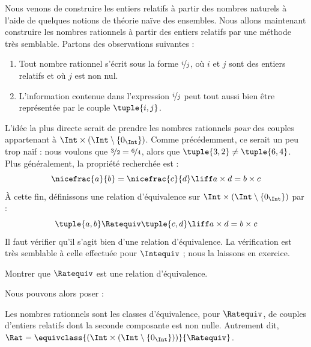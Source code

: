\documentclass[../../../include/open-logic-section]{subfiles}
\begin{document}

Nous venons de construire les entiers relatifs à partir des nombres naturels
à l'aide de quelques notions de théorie naïve des ensembles. Nous allons
maintenant construire les nombres rationnels à partir des entiers relatifs
par une méthode très semblable. Partons des observations suivantes :
\begin{enumerate}
	\item Tout nombre rationnel s'écrit sous la forme $\nicefrac{i}{j}$,
	où $i$ et $j$ sont des entiers relatifs et où $j$ est non nul.
	\item L'information contenue dans l'expression $\nicefrac{i}{j}$
	peut tout aussi bien être représentée par le couple $\tuple{ i, j}$.
\end{enumerate}
L'idée la plus directe serait de prendre les nombres rationnels \emph{pour}
des couples appartenant à $\Int \times (\Int \setminus \{0_\Int\})$.
Comme précédemment, ce serait un peu trop naïf : nous voulons que
$\nicefrac{3}{2} = \nicefrac{6}{4}$, alors que $\tuple{ 3, 2}\neq \tuple{ 6,
4}$. Plus généralement, la propriété recherchée est :
\[
	\nicefrac{a}{b} = \nicefrac{c}{d} \liff a \times d = b \times c
\]
À cette fin, définissons une {relation d'équivalence} sur $\Int \times
(\Int \setminus \{0_\Int\})$ par :
\[
	\tuple{ a, b }\Ratequiv \tuple{ c, d} \liff a \times d = b \times c
\]
Il faut vérifier qu'il s'agit bien d'une relation d'équivalence. La vérification
est très semblable à celle effectuée pour $\Intequiv$ ; nous la laissons en exercice.
\begin{prob}
Montrer que $\Ratequiv$ est une relation d'équivalence.
\end{prob}
Nous pouvons alors poser :
\begin{defn}
Les nombres rationnels sont les classes d'équivalence, pour $\Ratequiv$, de couples
d'entiers relatifs dont la seconde composante est non nulle. Autrement dit,
$\Rat = \equivclass{(\Int \times (\Int\setminus \{0_\Int\}))}{\Ratequiv}$.
\end{defn}
\end{document}
